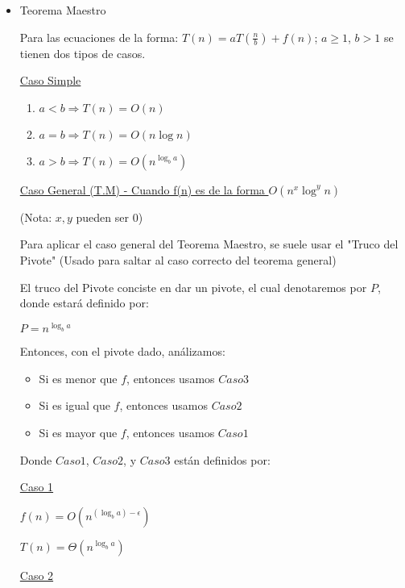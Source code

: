 \documentclass[12pt]{article}
\begin{document}
\begin{itemize}
  \item Teorema Maestro
  
  Para las ecuaciones de la forma: $T(n) = a T(\frac{n}{b}) + f(n)$; $a\geqslant 1$, $b>1$ se tienen dos tipos de casos.
  \begin{center}
    \underline{Caso Simple}
    
    \begin{enumerate}
      \item $a<b \Rightarrow T(n) = O(n)$
      \item $a=b \Rightarrow T(n) = O(n\log n)$
      \item $a>b \Rightarrow T(n) = O(n^{\log _b a})$
    \end{enumerate}
    \vspace{0.5em}
    \underline{Caso General (T.M) - Cuando f(n) es de la forma $O(n^x\log^yn)$}
    
    (Nota: $x, y$ pueden ser $0$)
  \end{center}
  Para aplicar el caso general del Teorema Maestro, se suele usar el "Truco del Pivote" (Usado para saltar al caso correcto del teorema general)
  \vspace{0.7em}
  
  El truco del Pivote conciste en dar un pivote, el cual denotaremos por $P$, donde estará definido por:
  \begin{center} 
    $P = n^{\log_b a}$  
  \end{center}
  
  Entonces, con el pivote dado, análizamos:
  \begin{itemize}
    \item Si es menor que $f$, entonces usamos $Caso 3$
    \item Si es igual que $f$, entonces usamos $Caso 2$
    \item Si es mayor que $f$, entonces usamos $Caso 1$
  \end{itemize}

  Donde $Caso 1$, $Caso 2$, y $Caso 3$ están definidos por:
  \vspace{1em}
  
  \begin{center}
    \underline{Caso 1}
    
    $f(n) = O(n^{(\log _b a) - \epsilon})$
    
    $T(n) = \varTheta (n^{\log _b a})$
    
  \end{center}
  \vspace{1em}
  \begin{center}
    \underline{Caso 2}
    

\end{center}
\end{itemize}
\end{document}
